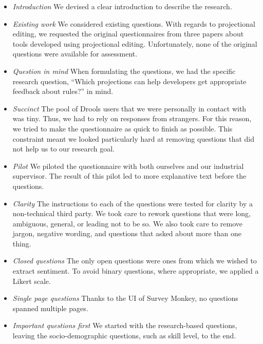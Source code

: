 \begin{itemize}    
    \setlength\itemsep{0em}
    \item \emph{Introduction} 
        We devised a clear introduction to describe the research.
    \item \emph{Existing work} 
        We considered existing questions.
        With regards to projectional editing, we requested the original questionnaires from three papers\cite{meacham2020adaptivevle,berger2016efficiency, voelter2014towards} about tools developed using projectional editing.
        Unfortunately, none of the original questions were available for assessment.
    \item \emph{Question in mind} 
        When formulating the questions, we had the specific research question, ``Which projections can help developers get appropriate feedback about rules?'' in mind.
    \item \emph{Succinct} 
        The pool of Drools users that we were personally in contact with was tiny.
        Thus, we had to rely on responses from strangers.
        For this reason, we tried to make the questionnaire as quick to finish as possible.
        This constraint meant we looked particularly hard at removing questions that did not help us to our research goal.
    \item \emph{Pilot} 
        We piloted the questionnaire with both ourselves and our industrial supervisor. 
        The result of this pilot led to more explanative text before the questions.
    \item \emph{Clarity} 
        The instructions to each of the questions were tested for clarity by a non-technical third party.
        We took care to rework questions that were long, ambiguous, general, or leading not to be so.
        We also took care to remove jargon, negative wording, and questions that asked about more than one thing.
    \item \emph{Closed questions} 
        The only open questions were ones from which we wished to extract sentiment.
        To avoid binary questions, where appropriate, we applied a Likert scale\cite{likert1932technique}.
    \item \emph{Single page questions} 
        Thanks to the UI of Survey Monkey, no questions spanned multiple pages.
    \item \emph{Important questions first} 
        We started with the research-based questions, leaving the socio-demographic questions, such as skill level, to the end.
\end{itemize}

